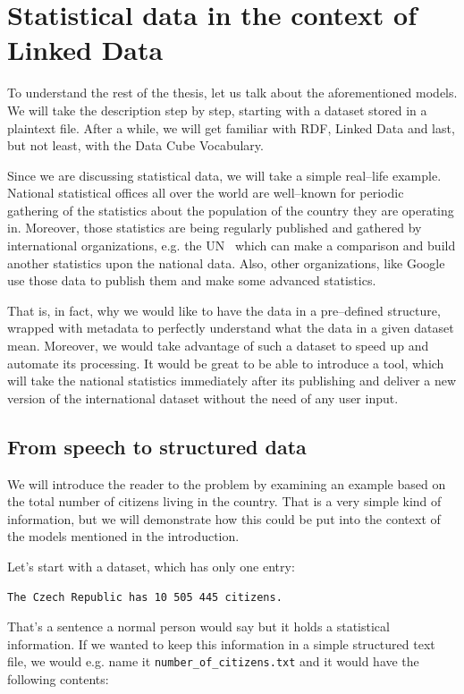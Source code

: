\chapter{Statistical data in the context of Linked Data}
\label{ch:statistical-data}
To understand the rest of the thesis, let us talk about the aforementioned models.
We will take the description step by step, starting with a dataset stored in a plaintext file.
After a while, we will get familiar with RDF, Linked Data and last, but not least, with the
Data Cube Vocabulary.

Since we are discussing statistical data, we will take a simple real--life example.
National statistical offices all over the world are well--known for periodic gathering of the
statistics about the population of the country they are operating in. Moreover, 
those statistics are being regularly published and gathered by international 
organizations, e.g. the UN~\cite{un} which can make a comparison and build 
another statistics upon the national data. Also, other organizations, like 
Google~\cite{pubdata} use those data to publish them and make 
some advanced statistics.

That is, in fact, why we would like to have the data in a pre--defined structure,
wrapped with metadata to perfectly understand what the data in a given 
dataset mean. Moreover, we would take advantage of such a dataset to speed up 
and automate its processing. It would be great to be able to introduce a tool, 
which will take the national statistics immediately after its publishing and 
deliver a new version of the international dataset without the need of any user 
input.

\section{From speech to structured data}

We will introduce the reader to the problem by examining an example based on the total number of
citizens living in the country. That is a very simple kind of information, but we will demonstrate
how this could be put into the context of the models mentioned in the introduction.

Let’s start with a dataset, which has only one entry:

\begin{verbatim}
The Czech Republic has 10 505 445 citizens.
\end{verbatim}

That’s a sentence a normal person would say but it holds a statistical information.
If we wanted to keep this information in a simple structured text file, we would e.g. name it
\texttt{number\_of\_citizens.txt} and it would have the following contents:

